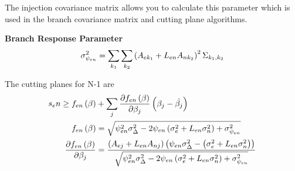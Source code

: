 The injection covariance matrix allows you to calculate this parameter which is used in the branch covariance matrix and cutting plane algorithms.

\textbf{Branch Response Parameter}
\begin{equation}
\sigma^2_{\psi_{en}} = \sum_{k_1} \sum_{k_2} \left(A_{ek_1} + L_{en} A_{nk_2}\right)^2 \Sigma_{k_1,k_2}
\end{equation}

The cutting planes for N-1 are
\begin{align*}
s_en \geq f_{en}\left(\beta\right) &+ \sum_j \frac{\partial f_{en}\left(\beta \right)}{\partial \beta_j} \left( \beta_j - \hat{\beta_j} \right)\\
f_{en}\left(\beta\right) &= \sqrt{ \psi_{en}^2 \sigma_\Delta^2 - 2 \psi_{en} \left( \sigma_e^2 + L_{en} \sigma_n^2 \right) + \sigma^2_{\psi_{en}}} \\
  \frac{\partial f_{en}\left(\beta \right)}{\partial \beta_j} &= \frac{\left(A_{ej} + L_{en}A_{nj}\right) \left( \psi_{en} \sigma_\Delta^2 - \left(\sigma_e^2 + L_{en} \sigma_n^2 \right) \right)}{\sqrt{\psi_{en}^2 \sigma_\Delta^2 - 2 \psi_{en} \left(\sigma_e^2  + L_{en}\sigma_n^2 \right) + \sigma^2_{\psi_{en}} }}
\end{align*}
